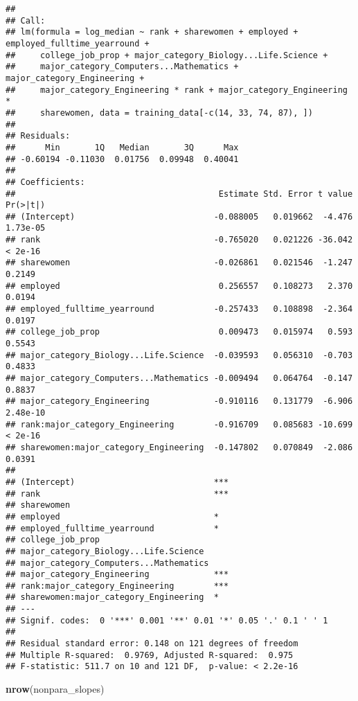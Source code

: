 \documentclass[
]{article}
\newenvironment{Shaded}{\begin{snugshade}}{\end{snugshade}}
\newcommand{\KeywordTok}[1]{\textcolor[rgb]{0.13,0.29,0.53}{\textbf{#1}}}
\newcommand{\NormalTok}[1]{#1}
\begin{document}
\begin{verbatim}
## 
## Call:
## lm(formula = log_median ~ rank + sharewomen + employed + employed_fulltime_yearround + 
##     college_job_prop + major_category_Biology...Life.Science + 
##     major_category_Computers...Mathematics + major_category_Engineering + 
##     major_category_Engineering * rank + major_category_Engineering * 
##     sharewomen, data = training_data[-c(14, 33, 74, 87), ])
## 
## Residuals:
##      Min       1Q   Median       3Q      Max 
## -0.60194 -0.11030  0.01756  0.09948  0.40041 
## 
## Coefficients:
##                                         Estimate Std. Error t value Pr(>|t|)
## (Intercept)                            -0.088005   0.019662  -4.476 1.73e-05
## rank                                   -0.765020   0.021226 -36.042  < 2e-16
## sharewomen                             -0.026861   0.021546  -1.247   0.2149
## employed                                0.256557   0.108273   2.370   0.0194
## employed_fulltime_yearround            -0.257433   0.108898  -2.364   0.0197
## college_job_prop                        0.009473   0.015974   0.593   0.5543
## major_category_Biology...Life.Science  -0.039593   0.056310  -0.703   0.4833
## major_category_Computers...Mathematics -0.009494   0.064764  -0.147   0.8837
## major_category_Engineering             -0.910116   0.131779  -6.906 2.48e-10
## rank:major_category_Engineering        -0.916709   0.085683 -10.699  < 2e-16
## sharewomen:major_category_Engineering  -0.147802   0.070849  -2.086   0.0391
##                                           
## (Intercept)                            ***
## rank                                   ***
## sharewomen                                
## employed                               *  
## employed_fulltime_yearround            *  
## college_job_prop                          
## major_category_Biology...Life.Science     
## major_category_Computers...Mathematics    
## major_category_Engineering             ***
## rank:major_category_Engineering        ***
## sharewomen:major_category_Engineering  *  
## ---
## Signif. codes:  0 '***' 0.001 '**' 0.01 '*' 0.05 '.' 0.1 ' ' 1
## 
## Residual standard error: 0.148 on 121 degrees of freedom
## Multiple R-squared:  0.9769, Adjusted R-squared:  0.975 
## F-statistic: 511.7 on 10 and 121 DF,  p-value: < 2.2e-16
\end{verbatim}

\begin{Shaded}
\begin{Highlighting}[]
\KeywordTok{nrow}\NormalTok{(nonpara_slopes)}
\end{Highlighting}
\end{Shaded}
\end{document}
